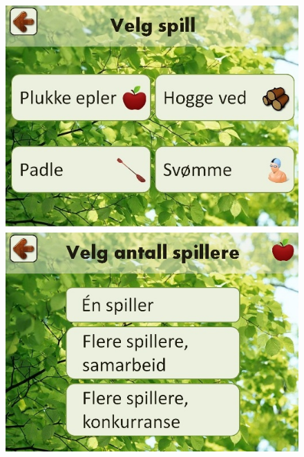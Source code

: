 \begin{figure} [H]
\centering
\includegraphics[scale=0.5]{IconEple.jpg}
\label{fig:iconEpleNorsk}
\end{figure} 


